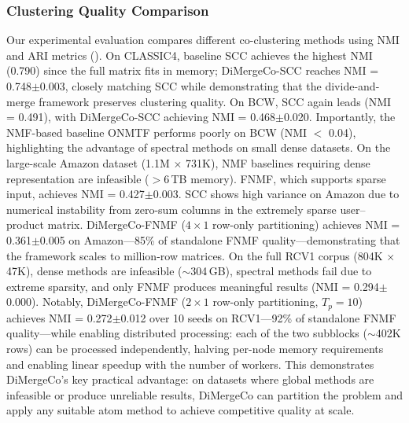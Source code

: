 \documentclass[journal]{IEEEtran}
\theoremstyle{definition}
\theoremstyle{remark} %
\begin{document}
\subsubsection{Clustering Quality Comparison}
\label{subsec:clustering-quality}
{\color{blue}Our experimental evaluation compares different co-clustering methods using NMI and ARI metrics (). On CLASSIC4, baseline SCC achieves the highest NMI (0.790) since the full matrix fits in memory; DiMergeCo-SCC reaches NMI = 0.748$\pm$0.003, closely matching SCC while demonstrating that the divide-and-merge framework preserves clustering quality. On BCW, SCC again leads (NMI = 0.491), with DiMergeCo-SCC achieving NMI = 0.468$\pm$0.020. Importantly, the NMF-based baseline ONMTF performs poorly on BCW (NMI $<$ 0.04), highlighting the advantage of spectral methods on small dense datasets. On the large-scale Amazon dataset (1.1M $\times$ 731K), NMF baselines requiring dense representation are infeasible ($>$6\,TB memory). FNMF, which supports sparse input, achieves NMI = 0.427$\pm$0.003. SCC shows high variance on Amazon due to numerical instability from zero-sum columns in the extremely sparse user--product matrix. DiMergeCo-FNMF ($4{\times}1$ row-only partitioning) achieves NMI = 0.361$\pm$0.005 on Amazon---85\% of standalone FNMF quality---demonstrating that the framework scales to million-row matrices. On the full RCV1 corpus (804K $\times$ 47K), dense methods are infeasible ($\sim$304\,GB), spectral methods fail due to extreme sparsity, and only FNMF produces meaningful results (NMI = 0.294$\pm$0.000). Notably, DiMergeCo-FNMF ($2{\times}1$ row-only partitioning, $T_p{=}10$) achieves NMI = 0.272$\pm$0.012 over 10 seeds on RCV1---92\% of standalone FNMF quality---while enabling distributed processing: each of the two subblocks ($\sim$402K rows) can be processed independently, halving per-node memory requirements and enabling linear speedup with the number of workers. This demonstrates DiMergeCo's key practical advantage: on datasets where global methods are infeasible or produce unreliable results, DiMergeCo can partition the problem and apply any suitable atom method to achieve competitive quality at scale.}
\end{document}
